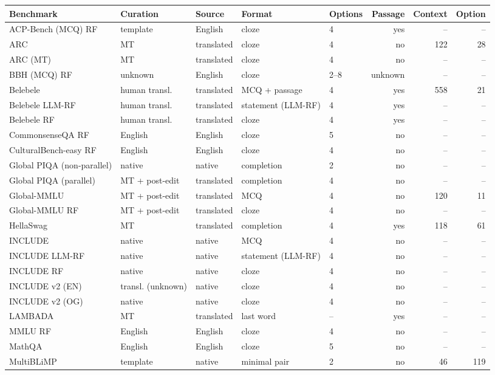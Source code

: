 \begin{tabular}{lllllrrr}
\toprule
Benchmark & Curation & Source & Format & Options & Passage & Context & Option \\
\midrule
ACP-Bench (MCQ) RF & template & English & cloze & 4 & yes & -- & -- \\
ARC & MT & translated & cloze & 4 & no & 122 & 28 \\
ARC (MT) & MT & translated & cloze & 4 & no & -- & -- \\
BBH (MCQ) RF & unknown & English & cloze & 2--8 & unknown & -- & -- \\
Belebele & human transl. & translated & MCQ + passage & 4 & yes & 558 & 21 \\
Belebele LLM-RF & human transl. & translated & statement (LLM-RF) & 4 & yes & -- & -- \\
Belebele RF & human transl. & translated & cloze & 4 & yes & -- & -- \\
CommonsenseQA RF & English & English & cloze & 5 & no & -- & -- \\
CulturalBench-easy RF & English & English & cloze & 4 & no & -- & -- \\
Global PIQA (non-parallel) & native & native & completion & 2 & no & -- & -- \\
Global PIQA (parallel) & MT + post-edit & translated & completion & 4 & no & -- & -- \\
Global-MMLU & MT + post-edit & translated & MCQ & 4 & no & 120 & 11 \\
Global-MMLU RF & MT + post-edit & translated & cloze & 4 & no & -- & -- \\
HellaSwag & MT & translated & completion & 4 & yes & 118 & 61 \\
INCLUDE & native & native & MCQ & 4 & no & -- & -- \\
INCLUDE LLM-RF & native & native & statement (LLM-RF) & 4 & no & -- & -- \\
INCLUDE RF & native & native & cloze & 4 & no & -- & -- \\
INCLUDE v2 (EN) & transl. (unknown) & native & cloze & 4 & no & -- & -- \\
INCLUDE v2 (OG) & native & native & cloze & 4 & no & -- & -- \\
LAMBADA & MT & translated & last word & -- & yes & -- & -- \\
MMLU RF & English & English & cloze & 4 & no & -- & -- \\
MathQA & English & English & cloze & 5 & no & -- & -- \\
MultiBLiMP & template & native & minimal pair & 2 & no & 46 & 119 \\

\end{tabular}
